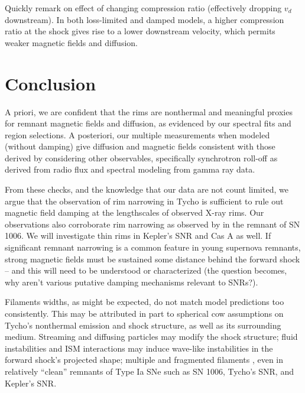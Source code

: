 \documentclass[iop, apj, numberedappendix]{emulateapj}
\begin{document}
Quickly remark on effect of changing compression ratio (effectively dropping
$v_d$ downstream).  In both loss-limited and damped models, a higher
compression ratio at the shock gives rise to a lower downstream velocity, which
permits weaker magnetic fields and diffusion.

\section{Conclusion}

A priori, we are confident that the rims are nonthermal and meaningful proxies
for remnant magnetic fields and diffusion, as evidenced by our spectral fits
and region selections.
A posteriori, our multiple measurements when modeled (without damping) give
diffusion and magnetic fields consistent with those derived by considering
other observables, specifically synchrotron roll-off as derived from radio flux
and spectral modeling from gamma ray data.

From these checks, and the knowledge that our data are not count limited, we
argue that the observation of rim narrowing in Tycho is sufficient to
rule out magnetic field damping at the lengthscales of observed X-ray rims.
Our observations also corroborate rim narrowing as observed by
\citet{ressler2014} in the remnant of SN 1006.  We will investigate thin rims
in Kepler's SNR and Cas A \citep[but cf.][]{araya2010} as well.  If significant
remnant narrowing is a common feature in young supernova remnants, strong
magnetic fields must be sustained some distance behind the forward shock -- and
this will need to be understood or characterized (the question becomes, why
aren't various putative damping mechanisms relevant to SNRs?).

Filaments widths, as might be expected, do not match model predictions too
consistently.  This may be attributed in part to spherical cow assumptions on
Tycho's nonthermal emission and shock structure, as well as its surrounding
medium.  Streaming and diffusing particles may modify the shock structure;
fluid instabilities and ISM interactions may induce wave-like instabilities in
the forward shock's projected shape; multiple and fragmented filaments
\citep{caprioli2013},
even in relatively ``clean'' remnants of Type Ia SNe such as SN 1006, Tycho's
SNR, and Kepler's SNR. 
\end{document}
